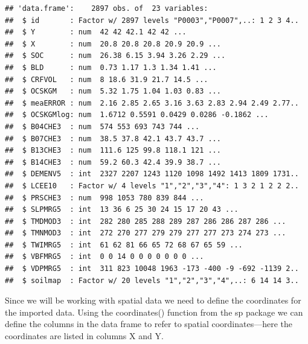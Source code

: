 \documentclass[10pt,b5paper,]{book}
\newenvironment{Shaded}{\begin{snugshade}}{\end{snugshade}}
\newcommand{\CommentTok}[1]{\textcolor[rgb]{0.56,0.35,0.01}{\textit{#1}}}
\newcommand{\KeywordTok}[1]{\textcolor[rgb]{0.13,0.29,0.53}{\textbf{#1}}}
\newcommand{\NormalTok}[1]{#1}
\newcommand{\OperatorTok}[1]{\textcolor[rgb]{0.81,0.36,0.00}{\textbf{#1}}}
\newcommand{\StringTok}[1]{\textcolor[rgb]{0.31,0.60,0.02}{#1}}
\theoremstyle{definition}
\theoremstyle{definition}
\theoremstyle{definition}
\theoremstyle{remark}
\begin{document}
\begin{Shaded}
\end{Shaded}

\begin{verbatim}
## 'data.frame':    2897 obs. of  23 variables:
##  $ id       : Factor w/ 2897 levels "P0003","P0007",..: 1 2 3 4..
##  $ Y        : num  42 42 42.1 42 42 ...
##  $ X        : num  20.8 20.8 20.8 20.9 20.9 ...
##  $ SOC      : num  26.38 6.15 3.94 3.26 2.29 ...
##  $ BLD      : num  0.73 1.17 1.3 1.34 1.41 ...
##  $ CRFVOL   : num  8 18.6 31.9 21.7 14.5 ...
##  $ OCSKGM   : num  5.32 1.75 1.04 1.03 0.83 ...
##  $ meaERROR : num  2.16 2.85 2.65 3.16 3.63 2.83 2.94 2.49 2.77..
##  $ OCSKGMlog: num  1.6712 0.5591 0.0429 0.0286 -0.1862 ...
##  $ B04CHE3  : num  574 553 693 743 744 ...
##  $ B07CHE3  : num  38.5 37.8 42.1 43.7 43.7 ...
##  $ B13CHE3  : num  111.6 125 99.8 118.1 121 ...
##  $ B14CHE3  : num  59.2 60.3 42.4 39.9 38.7 ...
##  $ DEMENV5  : int  2327 2207 1243 1120 1098 1492 1413 1809 1731..
##  $ LCEE10   : Factor w/ 4 levels "1","2","3","4": 1 3 2 1 2 2 2..
##  $ PRSCHE3  : num  998 1053 780 839 844 ...
##  $ SLPMRG5  : int  13 36 6 25 30 24 15 17 20 43 ...
##  $ TMDMOD3  : int  282 280 285 288 289 287 286 286 287 286 ...
##  $ TMNMOD3  : int  272 270 277 279 279 277 277 273 274 273 ...
##  $ TWIMRG5  : int  61 62 81 66 65 72 68 67 65 59 ...
##  $ VBFMRG5  : int  0 0 14 0 0 0 0 0 0 0 ...
##  $ VDPMRG5  : int  311 823 10048 1963 -173 -400 -9 -692 -1139 2..
##  $ soilmap  : Factor w/ 20 levels "1","2","3","4",..: 6 14 14 3..
\end{verbatim}

Since we will be working with spatial data we need to define the
coordinates for the imported data. Using the coordinates() function from
the sp  package we can define the columns in the
data frame to refer to spatial coordinates---here the coordinates are
listed in columns X and Y.
\end{document}
